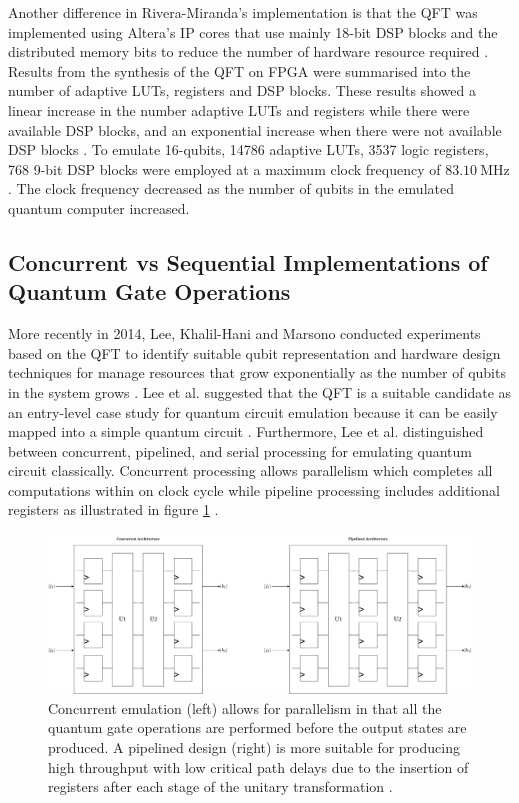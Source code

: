 
Another difference in Rivera-Miranda's implementation is that the QFT was implemented using Altera's IP cores that use mainly 18-bit DSP blocks and the distributed memory bits to reduce the number of hardware resource required \cite{rivera2011hardware}. Results from the synthesis of the QFT on FPGA were summarised into the number of adaptive LUTs, registers and DSP blocks. These results showed a linear increase in the number adaptive LUTs and registers while there were available DSP blocks, and an exponential increase when there were not available DSP blocks \cite{rivera2011hardware}. To emulate 16-qubits, 14786 adaptive LUTs, 3537 logic registers, 768 9-bit DSP blocks were employed at a maximum clock frequency of $\SI{83.10}{\mega\hertz}$ \cite{rivera2011hardware}. The clock frequency decreased as the number of qubits in the emulated quantum computer increased.

\subsection{Concurrent vs Sequential Implementations of Quantum Gate Operations}

More recently in 2014, Lee, Khalil-Hani and Marsono conducted experiments based on the QFT to identify suitable qubit representation and hardware design techniques for manage resources that grow exponentially as the number of qubits in the system grows \cite{lee2014fpga}. Lee et al. suggested that the QFT is a suitable candidate as an entry-level case study for quantum circuit emulation because it can be easily mapped into a simple quantum circuit \cite{lee2014fpga}. Furthermore, Lee et al. distinguished between concurrent, pipelined, and serial processing for emulating quantum circuit classically. Concurrent processing allows parallelism which completes all computations within on clock cycle while pipeline processing includes additional registers as illustrated in figure \ref{fig:lee-concurrent-v-pipeline} \cite{lee2014fpga}.

\begin{figure}[!ht]
	\centering
	\includegraphics[width=1.0\linewidth]{body/ch3/figs/lee-concurrent-vs-pipeline}
	\caption[Side-by-Side Comparison of Concurrent and Pipelined Emulation by Lee et al.]{Concurrent emulation (left) allows for parallelism in that all the quantum gate operations are performed before the output states are produced. A pipelined design (right) is more suitable for producing high throughput with low critical path delays due to the insertion of registers after each stage of the unitary transformation \cite{lee2014fpga}.}
	\label{fig:lee-concurrent-v-pipeline}
\end{figure}

